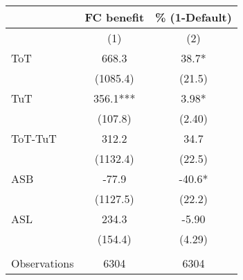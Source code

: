 \begin{tabular}{lcc}
\toprule
      & FC benefit & \% (1-Default) \\
\midrule
      & (1)   & (2) \\
\midrule
\midrule
ToT   & 668.3 & 38.7* \\
      & (1085.4) & (21.5) \\
TuT   & 356.1*** & 3.98* \\
      & (107.8) & (2.40) \\
\midrule
ToT-TuT & 312.2 & 34.7 \\
      & (1132.4) & (22.5) \\
ASB   & -77.9 & -40.6* \\
      & (1127.5) & (22.2) \\
ASL   & 234.3 & -5.90 \\
      & (154.4) & (4.29) \\
      &       &  \\
\midrule
Observations & 6304  & 6304 \\
\bottomrule
\bottomrule
\end{tabular}%
